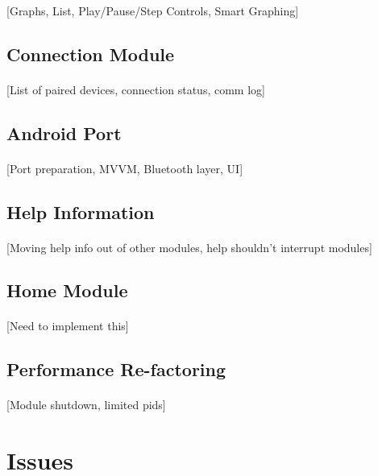 		\paragraph{}{
		[Graphs, List, Play/Pause/Step Controls, Smart Graphing]
		}	
	
	\subsection{Connection Module}
		\paragraph{}{
		[List of paired devices, connection status, comm log]
		}
	
	\subsection{Android Port}
		\paragraph{}{
		[Port preparation, MVVM, Bluetooth layer, UI]
		}	

	\subsection{Help Information}
		\paragraph{}{
		[Moving help info out of other modules, help shouldn't interrupt modules]
		}
	
	\subsection{Home Module}
		\paragraph{}{
		[Need to implement this]
		}
	
	\subsection{Performance Re-factoring}
		\paragraph{}{
		[Module shutdown, limited pids]
		}
	
\section{Issues}
